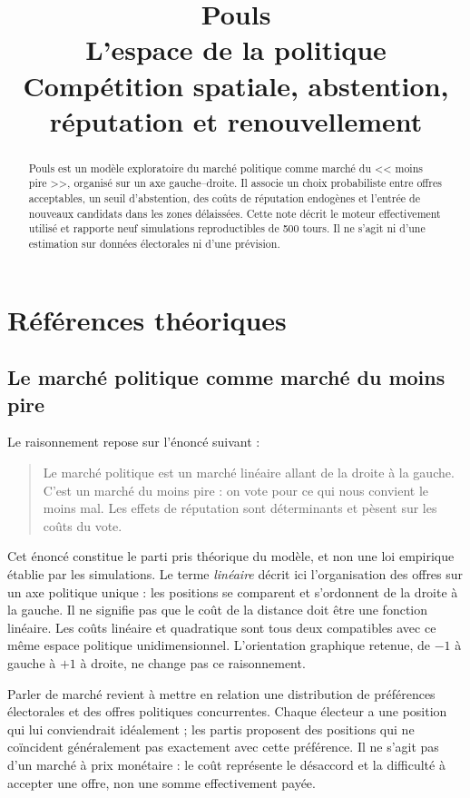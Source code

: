 \documentclass[11pt,a4paper]{article}
\title{Pouls\\L'espace de la politique\\
\large Compétition spatiale, abstention, réputation et renouvellement}
\author{}
\date{}
\begin{document}
\maketitle
\begin{abstract}
Pouls est un modèle exploratoire du marché politique comme marché du
<< moins pire >>, organisé sur un axe gauche--droite. Il associe un choix probabiliste entre offres acceptables,
un seuil d'abstention, des coûts de réputation endogènes et l'entrée de
nouveaux candidats dans les zones délaissées. Cette note décrit le moteur
effectivement utilisé et rapporte neuf simulations reproductibles de
500 tours. Il ne s'agit ni d'une estimation sur données électorales ni
d'une prévision.
\end{abstract}

\section{Références théoriques}

\subsection{Le marché politique comme marché du moins pire}
Le raisonnement repose sur l'énoncé suivant :
\begin{quote}
Le marché politique est un marché linéaire allant de la droite à la
gauche. C'est un marché du moins pire : on vote pour ce qui nous
convient le moins mal. Les effets de réputation sont déterminants
et pèsent sur les coûts du vote.
\end{quote}
Cet énoncé constitue le parti pris théorique du modèle, et non une loi
empirique établie par les simulations. Le terme \emph{linéaire} décrit
ici l'organisation des offres sur un axe politique unique : les
positions se comparent et s'ordonnent de la droite à la gauche.
Il ne signifie pas que le coût de la distance doit être une fonction
linéaire. Les coûts linéaire et quadratique sont tous deux compatibles
avec ce même espace politique unidimensionnel. L'orientation graphique
retenue, de $-1$ à gauche à $+1$ à droite, ne change pas ce raisonnement.

Parler de marché revient à mettre en relation une distribution de
préférences électorales et des offres politiques concurrentes. Chaque
électeur a une position qui lui conviendrait idéalement ; les partis
proposent des positions qui ne coïncident généralement pas exactement
avec cette préférence. Il ne s'agit pas d'un marché à prix monétaire :
le coût représente le désaccord et la difficulté à accepter une offre,
non une somme effectivement payée.
\end{document}

